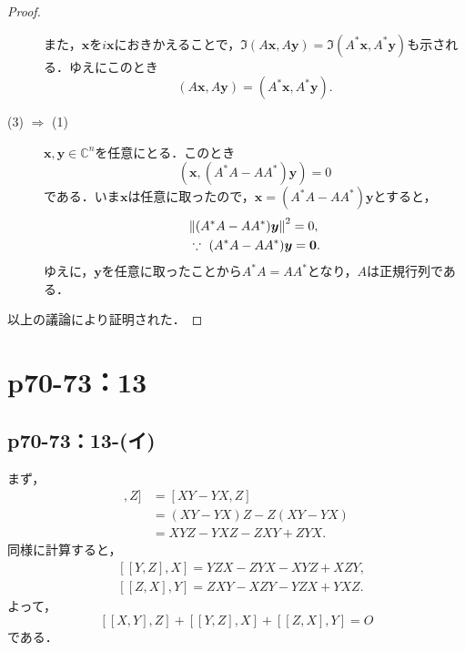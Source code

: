 \documentclass[a4paper,10pt,fleqn]{ltjsarticle}
\begin{document}
\begin{tleftbar}
\begin{proof}
\begin{description}
                  また，$\bm{x}$を$i\bm{x}$におきかえることで，$ \Im (A\bm{x}, A\bm{y}) = \Im (A^\ast \bm{x}, A^\ast\bm{y})$も示される．ゆえにこのとき
                  \[
                      (A\bm{x}, A\bm{y}) = (A^\ast \bm{x}, A^\ast\bm{y}).
                  \]
            \item[(3) $\Longrightarrow$ (1)] $\bm{x},\bm{y} \in \mathbb{C}^n$を任意にとる．このとき
                  \[
                      (\bm{x}, (A^\ast A-A A^\ast)\bm{y}) =0
                  \]
                  である．いま$\bm{x}$は任意に取ったので，$\bm{x}=(A^\ast A-A A^\ast)\bm{y}$とすると，
                  \begin{align*}
                       & \norm{(A^\ast A-A A^\ast)\bm{y}}^2  = 0,       \\
                       & \because ~ (A^\ast A-A A^\ast)\bm{y} = \bm{0}.
                  \end{align*}
                  ゆえに，$\bm{y}$を任意に取ったことから$A^\ast A=A A^\ast$となり，$A$は正規行列である．
        \end{description}
        以上の議論により証明された．
    \end{proof}
\end{tleftbar}

\newpage


\section*{p70-73：13}

\subsection*{p70-73：13-(イ)}

\begin{tleftbar}
    まず，
    \begin{align*}
        [ [X,Y],Z ] & = [XY-YX,Z]           \\
                    & = (XY-YX)Z -Z(XY-YX)  \\
                    & = XYZ -YXZ -ZXY +ZYX.
    \end{align*}
    同様に計算すると，
    \begin{align*}
         & [[Y,Z],X] = YZX -ZYX -XYZ +XZY,  \\
         & [ [Z,X],Y] = ZXY -XZY -YZX +YXZ.
    \end{align*}
    よって，
    \[
        [[X,Y],Z] +[[Y,Z],X]+[[Z,X],Y]=O
    \]
    である．
\end{tleftbar}
\end{document}
